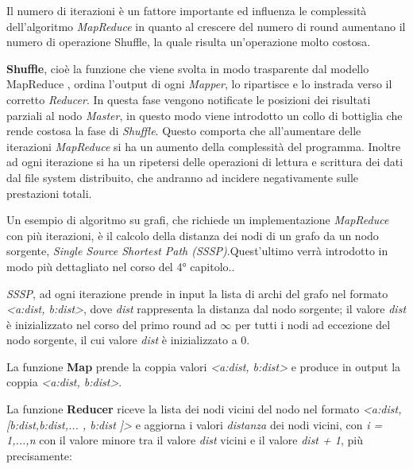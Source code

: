 \documentclass[LaM,binding=0.6cm]{sapthesis}
\begin{document}
Il numero di iterazioni è un fattore importante ed influenza le complessità dell'algoritmo \textit{MapReduce} in quanto al crescere del numero di round aumentano il numero di operazione Shuffle, la quale risulta un'operazione molto costosa.

\textbf{Shuffle}, cioè la funzione che viene svolta in modo trasparente dal modello MapReduce \cite{Dean:2008:MSD:1327452.1327492}, ordina l'output di ogni \textit{Mapper}, lo ripartisce e lo instrada verso il corretto \textit{Reducer}. In questa fase vengono notificate le posizioni dei risultati parziali al nodo \textit{Master}, in questo modo viene introdotto un collo di bottiglia che rende costosa la fase di \textit{Shuffle}. Questo comporta che all'aumentare delle iterazioni \textit{MapReduce} si ha un aumento della complessità del programma. Inoltre ad ogni iterazione si ha un ripetersi delle operazioni di lettura e scrittura dei dati dal file system distribuito, che andranno ad incidere negativamente sulle prestazioni totali.

Un esempio di algoritmo  su grafi, che richiede un implementazione \textit{MapReduce} con più iterazioni, è il calcolo della distanza dei nodi di un grafo da un nodo sorgente, \textit{Single Source Shortest Path (SSSP)}.Quest'ultimo verrà introdotto in modo più dettagliato nel corso del 4° capitolo..

\textit{SSSP}, ad ogni iterazione prende in input la lista di archi del grafo nel formato \textit{<a:dist, b:dist>}, dove \textit{dist} rappresenta la distanza dal nodo sorgente; il valore \textit{dist} è inizializzato nel corso del primo round ad $\infty$ per tutti i nodi ad eccezione del nodo sorgente, il cui valore \textit{dist} è inizializzato a 0.

La funzione \textbf{Map} prende la coppia valori 
\textit{<a:dist, b:dist>}
e produce in output la coppia 
 \textit{<a:dist, b:dist>}.
 
La funzione \textbf{Reducer} riceve la lista dei nodi vicini del nodo nel formato 
\textit{<a:dist, [b:dist,b:dist,... , b:dist ]>}
e aggiorna i valori\textit{ distanza} dei nodi vicini, con \textit{i = 1,...,n} con il valore minore tra il valore \textit{dist} vicini e il valore \textit{dist + 1}, più precisamente:

\begin{minipage}{\linewidth}
		
\end{minipage}
\end{document}
